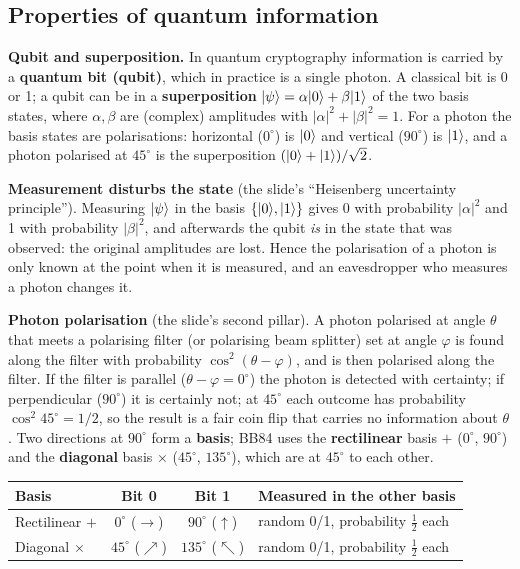 \subsection{Properties of quantum information \new}

\textbf{Qubit and superposition.} In quantum cryptography information is carried by a \textbf{quantum bit (qubit)}, which in practice is a single photon. A classical bit is 0 or 1; a qubit can be in a \textbf{superposition} $\lvert \psi\rangle = \alpha\lvert 0\rangle + \beta\lvert 1\rangle$ of the two basis states, where $\alpha, \beta$ are (complex) amplitudes with $|\alpha|^2 + |\beta|^2 = 1$. For a photon the basis states are polarisations: horizontal ($0^\circ$) is $\lvert 0\rangle$ and vertical ($90^\circ$) is $\lvert 1\rangle$, and a photon polarised at $45^\circ$ is the superposition $(\lvert 0\rangle + \lvert 1\rangle)/\sqrt 2$.

\textbf{Measurement disturbs the state} (the slide's ``Heisenberg uncertainty principle''). Measuring $\lvert \psi\rangle$ in the basis $\{\lvert 0\rangle, \lvert 1\rangle\}$ gives 0 with probability $|\alpha|^2$ and 1 with probability $|\beta|^2$, and afterwards the qubit \emph{is} in the state that was observed: the original amplitudes are lost. Hence the polarisation of a photon is only known at the point when it is measured, and an eavesdropper who measures a photon changes it.

\textbf{Photon polarisation} (the slide's second pillar). A photon polarised at angle $\theta$ that meets a polarising filter (or polarising beam splitter) set at angle $\varphi$ is found along the filter with probability $\cos^2(\theta - \varphi)$, and is then polarised along the filter. If the filter is parallel ($\theta - \varphi = 0^\circ$) the photon is detected with certainty; if perpendicular ($90^\circ$) it is certainly not; at $45^\circ$ each outcome has probability $\cos^2 45^\circ = 1/2$, so the result is a fair coin flip that carries no information about $\theta$. Two directions at $90^\circ$ form a \textbf{basis}; BB84 uses the \textbf{rectilinear} basis $+$ ($0^\circ$, $90^\circ$) and the \textbf{diagonal} basis $\times$ ($45^\circ$, $135^\circ$), which are at $45^\circ$ to each other.
\begin{center}\small
\begin{tabular}{@{}lccl@{}}
\toprule
Basis & Bit 0 & Bit 1 & Measured in the other basis\\
\midrule
Rectilinear $+$ & $0^\circ$ ($\rightarrow$) & $90^\circ$ ($\uparrow$) & random 0/1, probability $\tfrac12$ each\\
Diagonal $\times$ & $45^\circ$ ($\nearrow$) & $135^\circ$ ($\nwarrow$) & random 0/1, probability $\tfrac12$ each\\
\bottomrule
\end{tabular}
\end{center}

